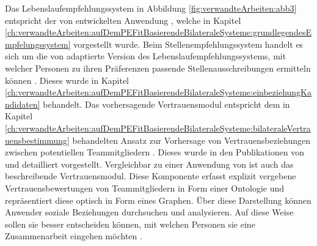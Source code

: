 Das Lebenslaufempfehlungssystem in Abbildung \ref{fig:verwandteArbeiten:abb3} entspricht der von \textcite[S. 8ff.]{faerber:2003} entwickelten Anwendung \cite[S. 6]{keim:2007}, welche in Kapitel \ref{ch:verwandteArbeiten:aufDemPEFitBasierendeBilateraleSysteme:grundlegendesEmpfelungssystem} vorgestellt wurde. Beim Stellenempfehlungssystem handelt es sich um die von \textcite[S. 4ff.]{malinowski:2006} adaptierte Version des Lebenslaufempfehlungssystems, mit welcher Personen zu ihren Präferenzen passende Stellenausschreibungen ermitteln können \cite[S. 6]{keim:2007}. Dieses wurde in Kapitel \ref{ch:verwandteArbeiten:aufDemPEFitBasierendeBilateraleSysteme:einbeziehungKandidaten} behandelt. Das vorhersagende Vertrauensmodul entspricht dem in Kapitel \ref{ch:verwandteArbeiten:aufDemPEFitBasierendeBilateraleSysteme:bilateraleVertrauensbestimmung} behandelten Ansatz zur Vorhersage von Vertrauensbeziehungen zwischen potentiellen Teammitgliedern \cite[S. 8]{keim:2007}. Dieses wurde in den Publikationen von \textcite[S. 5ff.]{keim:2005} und \textcite[S. 4ff.]{malinowski:2005} detailliert vorgestellt. Vergleichbar zu einer Anwendung von \textcite[S. 4f.]{keim:2005} ist auch das beschreibende Vertrauensmodul. Diese Komponente erfasst explizit vergebene Vertrauensbewertungen von Teammitgliedern in Form einer Ontologie und repräsentiert diese optisch in Form eines Graphen. Über diese Darstellung können Anwender soziale Beziehungen durchsuchen und analysieren. Auf diese Weise sollen sie besser entscheiden können, mit welchen Personen sie eine Zusammenarbeit eingehen möchten \cite[S. 7]{keim:2007}.

